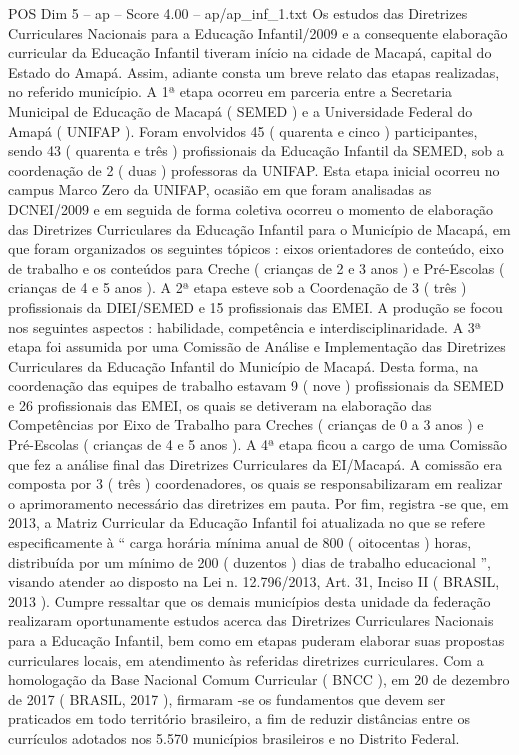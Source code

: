 \begin{textsample}{POS Dim 5 – ap – Score 4.00 – ap/ap\_inf\_1.txt}
Os estudos das Diretrizes Curriculares Nacionais para a Educação Infantil/2009 e a consequente elaboração curricular da Educação Infantil tiveram início na cidade de Macapá, capital do Estado do Amapá.
Assim, adiante consta um breve relato das etapas realizadas, no referido município.
A 1ª etapa ocorreu em parceria entre a Secretaria Municipal de Educação de Macapá ( SEMED ) e a Universidade Federal do Amapá ( UNIFAP ).
Foram envolvidos 45 ( quarenta e cinco ) participantes, sendo 43 ( quarenta e três ) profissionais da Educação Infantil da SEMED, sob a coordenação de 2 ( duas ) professoras da UNIFAP.
Esta etapa inicial ocorreu no campus Marco Zero da UNIFAP, ocasião em que foram analisadas as DCNEI/2009 e em seguida de forma coletiva ocorreu o momento de elaboração das Diretrizes Curriculares da Educação Infantil para o Município de Macapá, em que foram organizados os seguintes tópicos : eixos orientadores de conteúdo, eixo de trabalho e os conteúdos para Creche ( crianças de 2 e 3 anos ) e Pré-Escolas ( crianças de 4 e 5 anos ).
A 2ª etapa esteve sob a Coordenação de 3 ( três ) profissionais da DIEI/SEMED e 15 profissionais das EMEI.
A produção se focou nos seguintes aspectos : habilidade, competência e interdisciplinaridade.
A 3ª etapa foi assumida por uma Comissão de Análise e Implementação das Diretrizes Curriculares da Educação Infantil do Município de Macapá.
Desta forma, na coordenação das equipes de trabalho estavam 9 ( nove ) profissionais da SEMED e 26 profissionais das EMEI, os quais se detiveram na elaboração das Competências por Eixo de Trabalho para Creches ( crianças de 0 a 3 anos ) e Pré-Escolas ( crianças de 4 e 5 anos ).
A 4ª etapa ficou a cargo de uma Comissão que fez a análise final das Diretrizes Curriculares da EI/Macapá.
A comissão era composta por 3 ( três ) coordenadores, os quais se responsabilizaram em realizar o aprimoramento necessário das diretrizes em pauta.
Por fim, registra -se que, em 2013, a Matriz Curricular da Educação Infantil foi atualizada no que se refere especificamente à “ carga horária mínima anual de 800 ( oitocentas ) horas, distribuída por um mínimo de 200 ( duzentos ) dias de trabalho educacional ”, visando atender ao disposto na Lei n. 12.796/2013, Art. 31, Inciso II ( BRASIL, 2013 ).
Cumpre ressaltar que os demais municípios desta unidade da federação realizaram oportunamente estudos acerca das Diretrizes Curriculares Nacionais para a Educação Infantil, bem como em etapas puderam elaborar suas propostas curriculares locais, em atendimento às referidas diretrizes curriculares.
Com a homologação da Base Nacional Comum Curricular ( BNCC ), em 20 de dezembro de 2017 ( BRASIL, 2017 ), firmaram -se os fundamentos que devem ser praticados em todo território brasileiro, a fim de reduzir distâncias entre os currículos adotados nos 5.570 municípios brasileiros e no Distrito Federal.

\end{textsample}
